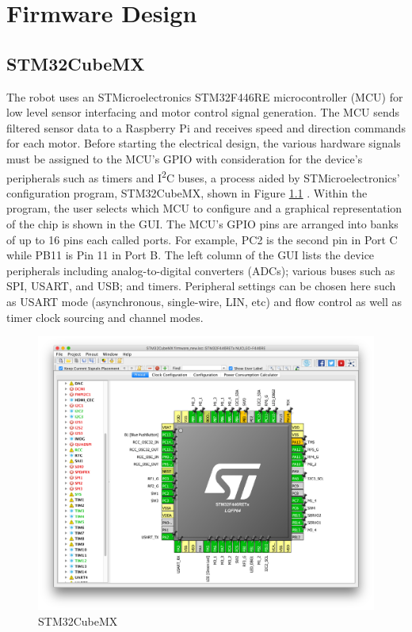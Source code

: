 \chapter{Firmware Design}
\section{STM32CubeMX}
The robot uses an STMicroelectronics STM32F446RE microcontroller (MCU) for low level sensor interfacing and motor control signal generation. The MCU sends filtered sensor data to a Raspberry Pi \cite{raspberrypi} and receives speed and direction commands for each motor. Before starting the electrical design, the various hardware signals must be assigned to the MCU's GPIO with consideration for the device's peripherals such as timers and I\textsuperscript{2}C buses, a process aided by STMicroelectronics' configuration program, STM32CubeMX, shown in Figure \ref{fig:stm32cubemx} \cite{stm32cubemx}. Within the program, the user selects which MCU to configure and a graphical representation of the chip is shown in the GUI. The MCU's GPIO pins are arranged into banks of up to 16 pins each called ports. For example, PC2 is the second pin in Port C while PB11 is Pin 11 in Port B. The left column of the GUI lists the device peripherals including analog-to-digital converters (ADCs); various buses such as SPI, USART, and USB; and timers. Peripheral settings can be chosen here such as USART mode (asynchronous, single-wire, LIN, etc) and flow control as well as timer clock sourcing and channel modes.
\begin{figure}[H]   %
	\centering \includegraphics[width=6in, keepaspectratio]{figures/stm32cubemx.png}
	\caption{STM32CubeMX}\label{fig:stm32cubemx}
\end{figure}
